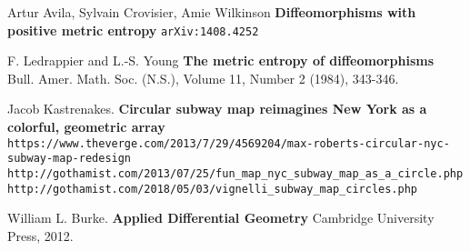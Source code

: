 \documentclass[12pt]{article}
\begin{document}
\begin{thebibliography}{}

\item Artur Avila, Sylvain Crovisier, Amie Wilkinson
\textbf{Diffeomorphisms with positive metric entropy} \texttt{arXiv:1408.4252}

\item F. Ledrappier and L.-S. Young \textbf{The metric entropy of diffeomorphisms} \\ Bull. Amer. Math. Soc. (N.S.), Volume 11, Number 2 (1984), 343-346.

\item Jacob Kastrenakes. \textbf{Circular subway map reimagines New York as a colorful, geometric array} \texttt{https://www.theverge.com/2013/7/29/4569204/max-roberts-circular-nyc-subway-map-redesign} \\
\texttt{http://gothamist.com/2013/07/25/fun\_map\_nyc\_subway\_map\_as\_a\_circle.php} \\
\texttt{http://gothamist.com/2018/05/03/vignelli\_subway\_map\_circles.php}

\item William L. Burke.  \textbf{Applied Differential Geometry} Cambridge University Press, 2012.

\end{thebibliography}
\end{document}
